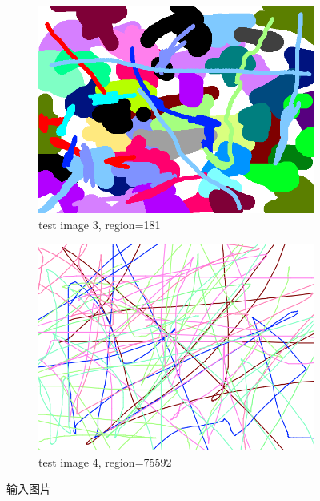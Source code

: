 \documentclass[a4paper, 11pt]{article}
\begin{document}
\begin{figure}[H]
    \begin{subfigure}[b]{0.3\textwidth}
        \centering
        \includegraphics[width=\textwidth]{images/origin/3.png}
        \caption{test image 3, region=181}
    \end{subfigure}
    \hspace{5mm}
    \begin{subfigure}[b]{0.3\textwidth}
        \centering
        \includegraphics[width=\textwidth]{images/origin/4.png}
        \caption{test image 4, region=75592}
    \end{subfigure}
    
\caption{输入图片}
\label{fig:uf_input}
\end{figure}
\end{document}
